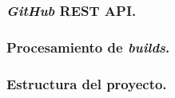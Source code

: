 \subsubsection{\textit{GitHub} REST API.}

\subsubsection{Procesamiento de \textit{builds}.}

\subsubsection{Estructura del proyecto.}
